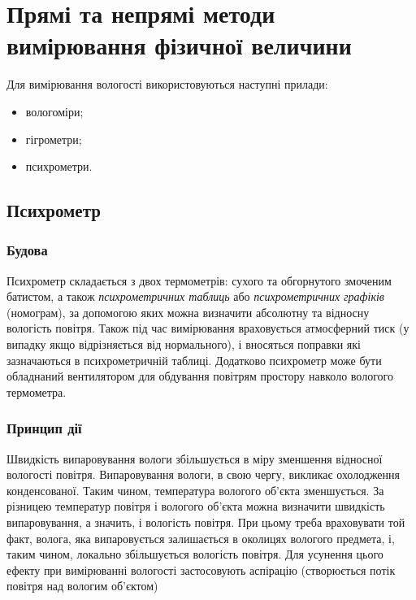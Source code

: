 \chapter{Прямі та непрямі методи вимірювання фізичної величини}

Для вимірювання вологості використовуються наступні прилади:

\begin{itemize} \tightlist
\item вологоміри;
\item гігрометри;
\item психрометри.
\end{itemize}

\section{Психрометр}

\subsection{Будова}

Психрометр складається з двох термометрів: сухого та обгорнутого змоченим батистом, а також
\emph{психрометричних таблиць} або \emph{психрометричних графіків} (номограм), за допомогою яких
можна визначити абсолютну та відносну вологість повітря. Також під час вимірювання враховується
атмосферний тиск (у випадку якщо відрізняється від нормального), і вносяться поправки які
зазначаються в психрометричній таблиці. Додатково психрометр може бути обладнаний вентилятором для
обдування повітрям простору навколо вологого термометра.

\subsection{Принцип дії}

Швидкість випаровування вологи збільшується в міру зменшення відносної вологості
повітря. Випаровування вологи, в свою чергу, викликає охолодження конденсованої. Таким чином,
температура вологого об'єкта зменшується. За різницею температур повітря і вологого об'єкта можна
визначити швидкість випаровування, а значить, і вологість повітря. При цьому треба враховувати той
факт, волога, яка випаровується залишається в околицях вологого предмета, і, таким чином, локально
збільшується вологість повітря. Для усунення цього ефекту при вимірюванні вологості застосовують
аспірацію (створюється потік повітря над вологим об'єктом)

